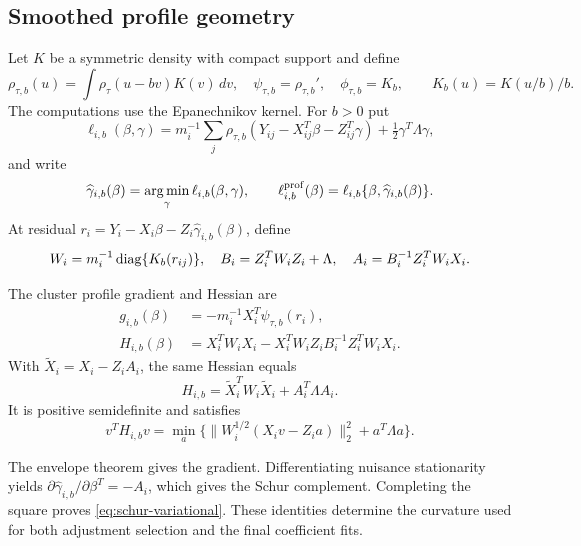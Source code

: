 \subsection{Smoothed profile geometry}\label{subsec:profile-calculus}

Let $K$ be a symmetric density with compact support and define
\begin{equation}\label{eq:smoothed-loss}
 \rho_{\tau,b}(u)=\int\rho_\tau(u-bv)K(v)\,dv,
 \quad \psi_{\tau,b}=\rho_{\tau,b}',\quad
 \phi_{\tau,b}=K_b,\qquad K_b(u)=K(u/b)/b.
\end{equation}
The computations use the Epanechnikov kernel. For $b>0$ put
\begin{equation}\label{eq:cluster-smoothed}
 \ell_{i,b}(\beta,\gamma)=m_i^{-1}\sum_j
 \rho_{\tau,b}(Y_{ij}-X_{ij}^T\beta-Z_{ij}^T\gamma)
                  +\tfrac12\gamma^T\Lambda\gamma,
\end{equation}
and write
\[
 \widehat\gamma_{i,b}(\beta)=\operatorname*{arg\,min}_\gamma\ell_{i,b}(\beta,\gamma),
 \qquad \ell_{i,b}^{\mathrm{prof}}(\beta)
          =\ell_{i,b}\{\beta,\widehat\gamma_{i,b}(\beta)\}.
\]
At residual $r_i=Y_i-X_i\beta-Z_i\widehat\gamma_{i,b}(\beta)$, define
\begin{equation}\label{eq:WiBiAi}
 W_i=m_i^{-1}\operatorname{diag}\{K_b(r_{ij})\},\quad
 B_i=Z_i^TW_iZ_i+\Lambda,\quad A_i=B_i^{-1}Z_i^TW_iX_i.
\end{equation}

\begin{proposition}\label{prop:profile-calculus}
The cluster profile gradient and Hessian are
\begin{align}
 g_{i,b}(\beta)&=-m_i^{-1}X_i^T\psi_{\tau,b}(r_i),
                                  \label{eq:profile-score}\\
 H_{i,b}(\beta)&=X_i^TW_iX_i-X_i^TW_iZ_iB_i^{-1}Z_i^TW_iX_i.
                                  \label{eq:heff-schur}
\end{align}
With $\widetilde X_i=X_i-Z_iA_i$, the same Hessian equals
\begin{equation}\label{eq:heff-ridge-identity}
 H_{i,b}=\widetilde X_i^TW_i\widetilde X_i+A_i^T\Lambda A_i.
\end{equation}
It is positive semidefinite and satisfies
\begin{equation}\label{eq:schur-variational}
 v^TH_{i,b}v=\min_a
 \{\|W_i^{1/2}(X_iv-Z_ia)\|_2^2+a^T\Lambda a\}.
\end{equation}
\end{proposition}

The envelope theorem gives the gradient. Differentiating nuisance
stationarity yields $\partial\widehat\gamma_{i,b}/\partial\beta^T=-A_i$,
which gives the Schur complement. Completing the square proves
\eqref{eq:schur-variational}. These identities determine the curvature
used for both adjustment selection and the final coefficient fits.
